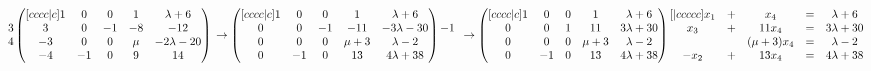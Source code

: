 \documentclass{article}
\begin{document}
\begin{math}
\begin{matrix}
          3\\
          4
        \end{matrix}
        \begin{pmatrix}[cccc|c]
            1 & 0 & 0 & 1 & \lambda + 6\\
            3 & 0 & -1 & -8 & -12\\
            -3 & 0 & 0 & \mu & -2\lambda - 20\\
            -4 & -1 & 0 & 9 & 14
        \end{pmatrix}\\
        \\
        \\
        \to
        \begin{pmatrix}[cccc|c]
            1 & 0 & 0 & 1 & \lambda + 6\\
            0 & 0 & -1 & -11 & -3\lambda - 30\\
            0 & 0 & 0 & \mu + 3 & \lambda - 2\\
            0 & -1 & 0 & 13 & 4\lambda + 38
        \end{pmatrix}
        \begin{matrix}
          ~\\
          -1\\
          ~\\
          ~
        \end{matrix}\\
        \\
        \\
        \to
        \begin{pmatrix}[cccc|c]
            1 & 0 & 0 & 1 & \lambda + 6\\
            0 & 0 & 1 & 11 & 3\lambda + 30\\
            0 & 0 & 0 & \mu + 3 & \lambda - 2\\
            0 & -1 & 0 & 13 & 4\lambda + 38
        \end{pmatrix}\\
        \\
        \\
        \begin{matrix}[|ccccc]
            x_1 & + & x_4 & = & \lambda + 6\\
            x_3 & + & 11x_4 & = & 3\lambda + 30\\
            ~ & ~ & (\mu + 3)x_4 & = & \lambda - 2\\
            -x_2 & + & 13x_4 & = & 4\lambda + 38
        \end{matrix}
    \end{math}
\end{document}
